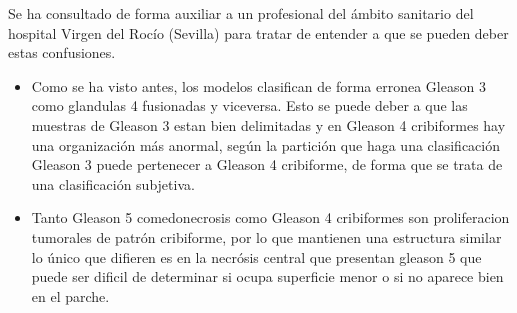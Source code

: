 Se ha consultado de forma auxiliar a un profesional del ámbito sanitario del hospital Virgen del Rocío (Sevilla) para tratar de entender a que se pueden deber estas confusiones. 
\begin{itemize}
  \item Como se ha visto antes, los modelos clasifican de forma erronea Gleason 3 como glandulas 4 fusionadas y viceversa. Esto se puede deber a que las muestras de Gleason 3 estan bien delimitadas y en Gleason 4 cribiformes hay una organización más anormal, según la partición que haga una clasificación Gleason 3 puede pertenecer a Gleason 4 cribiforme, de forma que se trata de una clasificación subjetiva.
  \item Tanto Gleason 5 comedonecrosis como Gleason 4 cribiformes son proliferacion tumorales de patrón cribiforme, por lo que mantienen una estructura similar lo único que difieren es en la necrósis central que presentan gleason 5 que puede ser dificil de determinar si ocupa superficie menor o si no aparece bien en el parche.
\end{itemize}

